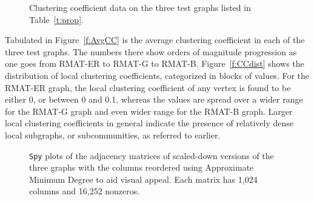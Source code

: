 \documentclass{article}
\begin{document}
\begin{figure}
\caption{Clustering coefficient data on the three test graphs listed in Table~\ref{t:prop}.}
\label{f:cc}
\end{figure}

Tabulated in Figure~\ref{f:AvgCC} is the average clustering coefficient in each of the three test graphs. 
The numbers there show orders of magnitude progression as one goes from 
RMAT-ER to RMAT-G to RMAT-B. 
Figure~\ref{f:CCdist} shows the distribution of local clustering coefficients, 
categorized in  blocks of values. For the RMAT-ER graph, the local clustering coefficient
of any vertex is found to be either 0, or between 0 and 0.1, whereas the values are spread
over a wider  range for the RMAT-G graph and even wider range for the RMAT-B graph.
Larger local clustering coefficients in general indicate the presence of relatively 
dense local subgraphs, or subcommunities, as referred to earlier.

\begin{figure}
\centering
{}
\caption{{\tt Spy} plots of the adjacency matrices of scaled-down versions of
the three graphs with the columns reordered using Approximate Minimum Degree to aid visual appeal.
Each matrix has  1,024 columns and 16,252 nonzeros. }
\label{f:spyplots-amd}
\end{figure}
\end{document}
